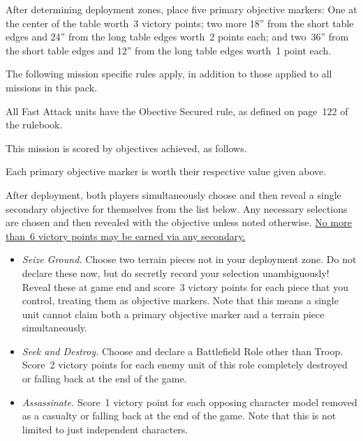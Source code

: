 \documentclass{40k}
\begin{document}
\bigskip%
After determining deployment zones, place five primary objective
markers: One at the center of the table worth~3 victory points; two
more 18'' from the short table edges and 24'' from the long table
edges worth~2 points each; and two~36'' from the short table edges and
12'' from the long table edges worth~1 point each.


The following mission specific rules apply, in addition to those
applied to all missions in this pack.

  All Fast Attack units have the
Obective Secured rule, as defined on page~122 of the rulebook.





This mission is scored by objectives achieved, as follows.

  Each primary objective marker
is worth their respective value given above.



After deployment, both players simultaneously choose and then reveal a
single secondary objective for themselves from the list below.  Any
necessary selections are chosen and then revealed with the objective
unless noted otherwise.  \underline{No more than~6 victory points may
  be earned via any secondary.}

\begin{itemize}
\item \textit{Seize Ground.}  Choose two terrain pieces not in your
  deployment zone.  Do not declare these now, but do secretly record
  your selection unambiguously!  Reveal these at game end and score~3
  victory points for each piece that you control, treating them as
  objective markers.  Note that this means a single unit cannot claim
  both a primary objective marker and a terrain piece simultaneously.

\item \textit{Seek and Destroy.}  Choose and declare a Battlefield
  Role other than Troop.  Score~2 victory points for each enemy unit
  of this role completely destroyed or falling back at the end of the
  game.

\item \textit{Assassinate.}  Score~1 victory point for each opposing
  character model removed as a casualty or falling back at the end of
  the game.  Note that this is not limited to just independent
  characters.
\end{itemize}
\end{document}
